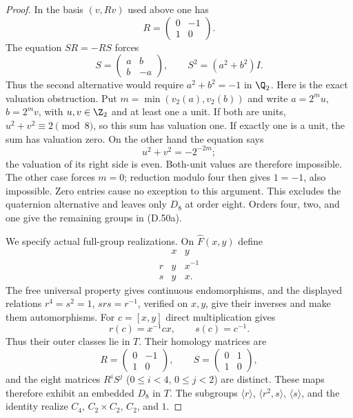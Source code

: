 \begin{proof}
In the basis $(v,Rv)$ used above one has
\[
 R=\begin{pmatrix}0&-1\\1&0\end{pmatrix}.
\]
The equation $SR=-RS$ forces
\[
             S=\begin{pmatrix}a&b\\b&-a\end{pmatrix},
             \qquad S^2=(a^2+b^2)I.
                                                        \tag{D.50g}
\]
Thus the second alternative would require
$a^2+b^2=-1$ in $\Q_2$.
Here is the exact valuation obstruction.
Put $m=\min(v_2(a),v_2(b))$ and write
$a=2^m u$, $b=2^m v$, with $u,v\in\Z_2$
and at least one a unit. If both are units,
$u^2+v^2\equiv2\pmod8$, so this sum has
valuation one. If exactly one is a unit,
the sum has valuation zero.
On the other hand the equation says
\[
                      u^2+v^2=-2^{-2m};
                                                        \tag{D.50h}
\]
the valuation of its right side is even.
Both-unit values are therefore impossible.
The other case forces $m=0$; reduction modulo
four then gives $1=-1$, also impossible.
Zero entries cause no exception to this
argument. This excludes the quaternion
alternative and leaves only $D_8$ at order
eight. Orders four, two, and one give the
remaining groups in (D.50a).

We specify actual full-group realizations.
On $\widehat F(x,y)$ define
\[
 \begin{array}{c|cc}
          &x&y\\ \hline
 r        &y&x^{-1}\\
 s        &y&x .
 \end{array}                                            \tag{D.50i}
\]
The free universal property gives continuous
endomorphisms, and the displayed relations
$r^4=s^2=1$, $srs=r^{-1}$, verified on
$x,y$, give their inverses and make them
automorphisms.
For $c=[x,y]$ direct multiplication gives
\[
                   r(c)=x^{-1}cx,\qquad
                   s(c)=c^{-1}.                        \tag{D.50j}
\]
Thus their outer classes lie in $T$.
Their homology matrices are
\[
             R=\begin{pmatrix}0&-1\\1&0\end{pmatrix},
       \qquad S=\begin{pmatrix}0&1\\1&0\end{pmatrix},
                                                        \tag{D.50k}
\]
and the eight matrices $R^iS^j$
($0\leq i<4$, $0\leq j<2$) are distinct.
These maps therefore exhibit an embedded
$D_8$ in $T$. The subgroups
$\langle r\rangle$, $\langle r^2,s\rangle$,
$\langle s\rangle$, and the identity realize
$C_4$, $C_2\times C_2$, $C_2$, and $1$.


\end{proof}
